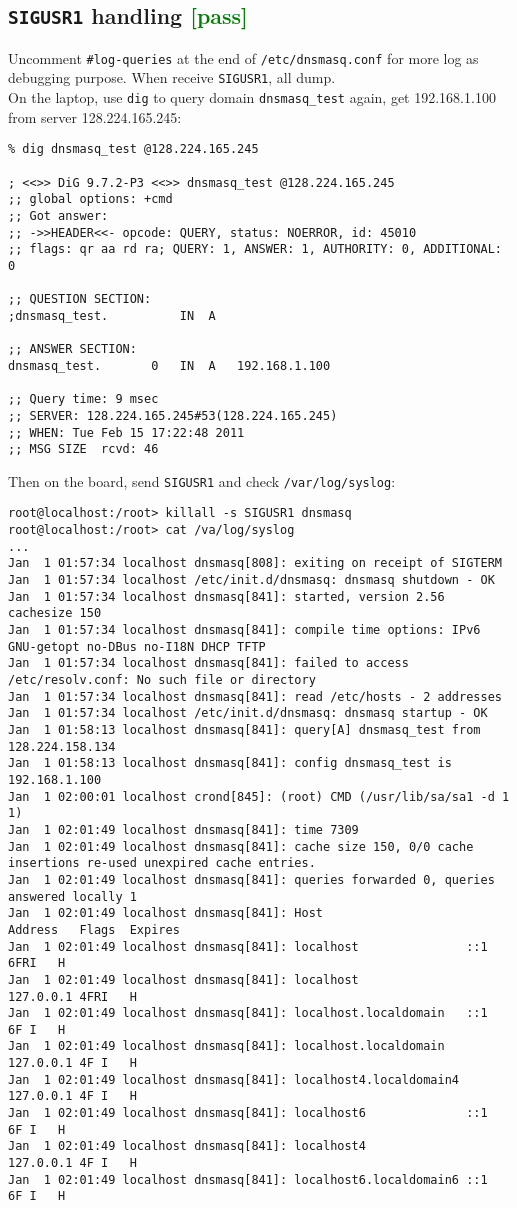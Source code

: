 \documentclass[a4paper]{report}
\begin{document}
\subsection{{\tt SIGUSR1} handling \textcolor{green}{[pass]}}
Uncomment {\tt #log-queries} at the end of {\tt /etc/dnsmasq.conf} for
more log as debugging purpose. When receive {\tt SIGUSR1}, all dump.\\
On the laptop, use {\tt dig} to query domain {\tt dnsmasq\_test} again, 
get 192.168.1.100 from server 128.224.165.245:
\begin{lstlisting}
% dig dnsmasq_test @128.224.165.245        

; <<>> DiG 9.7.2-P3 <<>> dnsmasq_test @128.224.165.245
;; global options: +cmd
;; Got answer:
;; ->>HEADER<<- opcode: QUERY, status: NOERROR, id: 45010
;; flags: qr aa rd ra; QUERY: 1, ANSWER: 1, AUTHORITY: 0, ADDITIONAL: 0

;; QUESTION SECTION:
;dnsmasq_test.			IN	A

;; ANSWER SECTION:
dnsmasq_test.		0	IN	A	192.168.1.100

;; Query time: 9 msec
;; SERVER: 128.224.165.245#53(128.224.165.245)
;; WHEN: Tue Feb 15 17:22:48 2011
;; MSG SIZE  rcvd: 46
\end{lstlisting}
Then on the board, send {\tt SIGUSR1} and check {\tt /var/log/syslog}:
\begin{lstlisting}
root@localhost:/root> killall -s SIGUSR1 dnsmasq
root@localhost:/root> cat /va/log/syslog
...
Jan  1 01:57:34 localhost dnsmasq[808]: exiting on receipt of SIGTERM
Jan  1 01:57:34 localhost /etc/init.d/dnsmasq: dnsmasq shutdown - OK
Jan  1 01:57:34 localhost dnsmasq[841]: started, version 2.56 cachesize 150
Jan  1 01:57:34 localhost dnsmasq[841]: compile time options: IPv6 GNU-getopt no-DBus no-I18N DHCP TFTP
Jan  1 01:57:34 localhost dnsmasq[841]: failed to access /etc/resolv.conf: No such file or directory
Jan  1 01:57:34 localhost dnsmasq[841]: read /etc/hosts - 2 addresses
Jan  1 01:57:34 localhost /etc/init.d/dnsmasq: dnsmasq startup - OK
Jan  1 01:58:13 localhost dnsmasq[841]: query[A] dnsmasq_test from 128.224.158.134
Jan  1 01:58:13 localhost dnsmasq[841]: config dnsmasq_test is 192.168.1.100
Jan  1 02:00:01 localhost crond[845]: (root) CMD (/usr/lib/sa/sa1 -d 1 1)
Jan  1 02:01:49 localhost dnsmasq[841]: time 7309
Jan  1 02:01:49 localhost dnsmasq[841]: cache size 150, 0/0 cache insertions re-used unexpired cache entries.
Jan  1 02:01:49 localhost dnsmasq[841]: queries forwarded 0, queries answered locally 1
Jan  1 02:01:49 localhost dnsmasq[841]: Host                    Address   Flags  Expires
Jan  1 02:01:49 localhost dnsmasq[841]: localhost               ::1       6FRI   H  
Jan  1 02:01:49 localhost dnsmasq[841]: localhost               127.0.0.1 4FRI   H  
Jan  1 02:01:49 localhost dnsmasq[841]: localhost.localdomain   ::1       6F I   H  
Jan  1 02:01:49 localhost dnsmasq[841]: localhost.localdomain   127.0.0.1 4F I   H  
Jan  1 02:01:49 localhost dnsmasq[841]: localhost4.localdomain4 127.0.0.1 4F I   H  
Jan  1 02:01:49 localhost dnsmasq[841]: localhost6              ::1       6F I   H  
Jan  1 02:01:49 localhost dnsmasq[841]: localhost4              127.0.0.1 4F I   H  
Jan  1 02:01:49 localhost dnsmasq[841]: localhost6.localdomain6 ::1       6F I   H  
\end{lstlisting}
\end{document}
